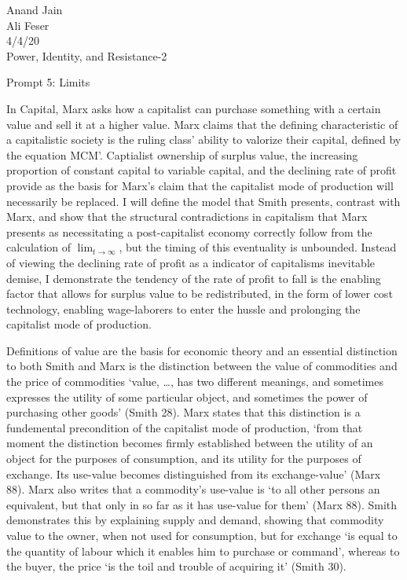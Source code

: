 \documentclass[12pt]{article}
\begin{document}
\noindent Anand Jain \\ 
Ali Feser \\
4/4/20 \\
Power, Identity, and Resistance-2 
\begin{center}
	Prompt 5: Limits   
\end{center}
In Capital, Marx asks how a capitalist can purchase something with a certain value and sell it at a higher value. 
Marx claims that the defining characteristic of a capitalistic society is the ruling class' ability to valorize their capital, defined by the equation MCM'. 
Captialist ownership of surplus value, the increasing proportion of constant capital to variable capital, and the declining rate of profit provide as the basis for Marx's claim that the capitalist mode of production will necessarily be replaced.
I will define the model that Smith presents, contrast with Marx, and show that the structural contradictions in capitalism that Marx presents as necessitating a post-capitalist economy correctly follow from the calculation of $\lim_{t \to \infty}$, but the timing of this eventuality is unbounded.
Instead of viewing the declining rate of profit as a indicator of capitalisms inevitable demise, I demonstrate the tendency of the rate of profit to fall is the enabling factor that allows for surplus value to be redistributed, in the form of lower cost technology, enabling wage-laborers to enter the hussle and prolonging the capitalist mode of production. \par 
Definitions of value are the basis for economic theory and an essential distinction to both Smith and Marx is the distinction between the value of commodities and the price of commodities `value, \ldots, has two different meanings, and sometimes expresses the utility of some particular object, and sometimes the power of purchasing other goods' (Smith 28). 
Marx states that this distinction is a fundemental precondition of the capitalist mode of production, `from that moment the distinction becomes firmly established between the utility of an object for the purposes of consumption, and its utility for the purposes of exchange. Its use-value becomes distinguished from its exchange-value' (Marx 88).
Marx also writes that a commodity's use-value is `to all other persons an equivalent, but that only in so far as it has use-value for them' (Marx 88).
Smith demonstrates this by explaining supply and demand, showing that commodity value to the owner, when not used for consumption, but for exchange `is equal to the quantity of labour which it enables him to purchase or command', whereas to the buyer, the price `is the toil and trouble of acquiring it' (Smith 30).
\end{document}
